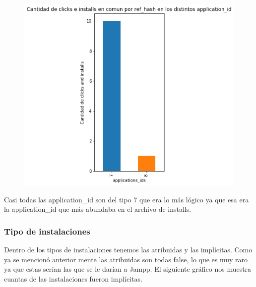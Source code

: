\documentclass[a4paper, 12pt]{article}
\newcommand\tab[1][1cm]{\hspace*{#1}}
\begin{document}
{{	 
		\begin{figure}[H]
			\centering
			\includegraphics[scale = 0.5]{images/clicks-installs/application_id.png}
			\caption{}
		\end{figure}
	
	
	Casi todas las application\_id son del tipo 7 que era lo más lógico ya que esa era la application\_id que más abundaba en el archivo de installs.
	
	\subsubsection{Tipo de instalaciones}
	Dentro de los tipos de instalaciones tenemos las atribuidas y las implícitas. Como ya se mencionó anterior mente las atribuidas son todas false, lo que es muy raro ya que estas serían las que se le darían a Jampp. 
	\newline
	\newline
	\tab El siguiente gráfico nos muestra cuantas de las instalaciones fueron implícitas.
	
}}
\end{document}
